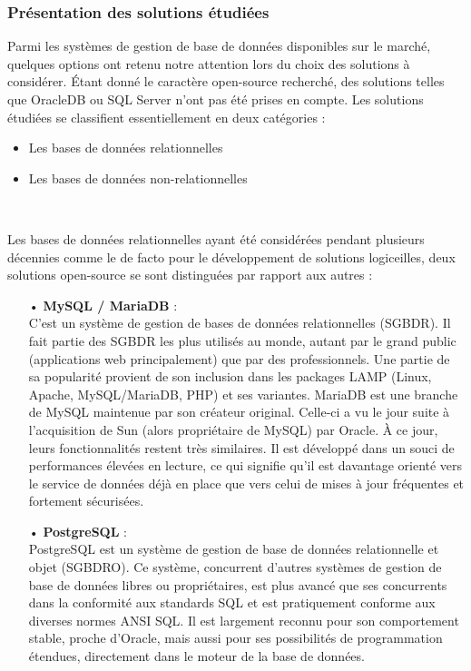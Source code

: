 \begin{spacing}{1.5}
\subsubsection{Présentation des solutions étudiées}%
Parmi les systèmes de gestion de base de données disponibles sur le marché, quelques options ont retenu notre attention lors du choix des solutions à considérer. Étant donné le caractère open-source recherché, des solutions telles que OracleDB ou SQL Server n’ont pas été prises en compte. Les solutions étudiées se classifient essentiellement en deux catégories :
\begin{itemize}
    \item Les bases de données relationnelles
    \item Les bases de données non-relationnelles
\end{itemize}
\

Les bases de données relationnelles ayant été considérées pendant plusieurs décennies comme le de facto pour le développement de solutions logiceilles, deux solutions open-source se sont distinguées par rapport aux autres :
\begin{itemize}
    \item[•] \textbf{MySQL / MariaDB} :\\
C’est un système de gestion de bases de données relationnelles (SGBDR). Il fait partie des SGBDR les plus utilisés au monde, autant par le grand public (applications web principalement) que par des professionnels. Une partie de sa popularité provient de son inclusion dans les packages LAMP (Linux, Apache, MySQL/MariaDB, PHP) et ses variantes. MariaDB est une branche de MySQL maintenue par son créateur original. Celle-ci a vu le jour suite à l’acquisition de Sun (alors propriétaire de MySQL) par Oracle. À ce jour, leurs fonctionnalités restent très similaires. Il est développé dans un souci de performances élevées en lecture, ce qui signifie qu'il est davantage orienté vers le service de données déjà en place que vers celui de mises à jour fréquentes et fortement sécurisées.
    \item[•] \textbf{PostgreSQL} :\\
PostgreSQL est un système de gestion de base de données relationnelle et objet (SGBDRO). Ce système, concurrent d'autres systèmes de gestion de base de données libres ou propriétaires, est plus avancé que ses concurrents dans la conformité aux standards SQL et est pratiquement conforme aux diverses normes ANSI SQL. Il est largement reconnu pour son comportement stable, proche d’Oracle, mais aussi pour ses possibilités de programmation étendues, directement dans le moteur de la base de données.
\end{itemize}
\


\end{spacing}
